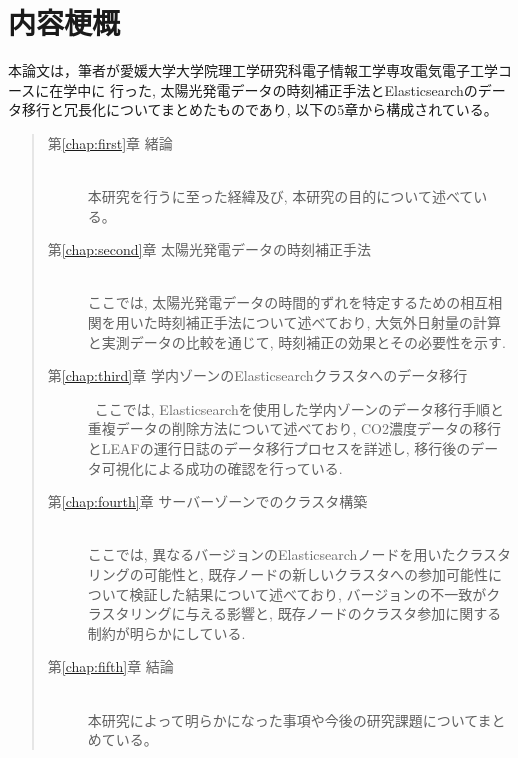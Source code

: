 \chapter*{内容梗概}

本論文は，筆者が愛媛大学大学院理工学研究科電子情報工学専攻電気電子工学コースに在学中に
行った, 太陽光発電データの時刻補正手法とElasticsearchのデータ移行と冗長化についてまとめたものであり, 以下の5章から構成されている。\\

\begin{quote}
      \begin{description}

            \item[第\ref{chap:first}章 緒論]\ \\
            本研究を行うに至った経緯及び, 本研究の目的について述べている。
            \vspace{3.0mm}
            
            \item[第\ref{chap:second}章 太陽光発電データの時刻補正手法]\ \\
            ここでは, 太陽光発電データの時間的ずれを特定するための相互相関を用いた時刻補正手法について述べており, 大気外日射量の計算と実測データの比較を通じて, 時刻補正の効果とその必要性を示す. 
            \vspace{3.0mm}
            
            \item[第\ref{chap:third}章 学内ゾーンのElasticsearchクラスタへのデータ移行]\
            ここでは, Elasticsearchを使用した学内ゾーンのデータ移行手順と重複データの削除方法について述べており, CO2濃度データの移行とLEAFの運行日誌のデータ移行プロセスを詳述し, 移行後のデータ可視化による成功の確認を行っている.
            \vspace{3.0mm}
            
            \item[第\ref{chap:fourth}章 サーバーゾーンでのクラスタ構築]\ \\
            ここでは, 異なるバージョンのElasticsearchノードを用いたクラスタリングの可能性と, 既存ノードの新しいクラスタへの参加可能性について検証した結果について述べており, バージョンの不一致がクラスタリングに与える影響と, 既存ノードのクラスタ参加に関する制約が明らかにしている.
            \vspace{3.0mm}
            
            \item[第\ref{chap:fifth}章 結論]\ \\
            本研究によって明らかになった事項や今後の研究課題についてまとめている。
      \end{description}
\end{quote}
